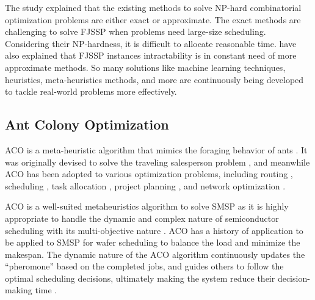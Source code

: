 The study \cite{lei2022multi} explained that the existing methods to solve NP-hard combinatorial optimization problems are either exact or approximate. The exact methods are challenging to solve FJSSP when problems need large-size scheduling. Considering their NP-hardness, it is difficult to allocate reasonable time. \cite{lei2022multi} have also explained that FJSSP instances intractability is in constant need of more approximate methods. So many solutions like machine learning techniques, heuristics, meta-heuristics methods, and more are continuously being developed to tackle real-world problems more effectively. 

\subsection{Ant Colony Optimization}
ACO is a %
meta-heuristic algorithm that mimics the foraging behavior of ants \cite{dorigo2019ant}.
It was originally devised to solve the traveling salesperson problem \cite{stutzle1999aco}, %
and meanwhile ACO has been adopted to various optimization problems, including routing \cite{rizzoli2007ant}, scheduling \cite{luo2008ant}, task allocation \cite{rugwiro2019task}, project planning \cite{khelifa2020holonic}, and network optimization \cite{wang2009hopnet}.

ACO is a well-suited metaheuristics algorithm to solve SMSP as it is highly appropriate to handle the dynamic and complex nature of semiconductor scheduling with its multi-objective nature \cite{nayar2021ant}. ACO has a history of application to be applied to SMSP for wafer scheduling to balance the load and minimize the makespan. The dynamic nature of the ACO algorithm continuously updates the “pheromone” based on the completed jobs, and guides others to follow the optimal scheduling decisions, ultimately making the system reduce their decision-making time \cite{zhou2022parameter}.

